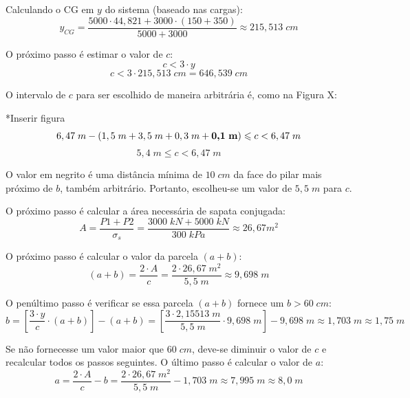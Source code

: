 Calculando o CG em $y$ do sistema (baseado nas cargas):
$$y_{CG}=\frac{5000\cdot44,821+3000\cdot(150+350)}{5000+3000}\approx215,513\;cm$$

O próximo passo é estimar o valor de $c$:
$$c<3\cdot y$$
$$c<3\cdot215,513\;cm=646,539\;cm$$

O intervalo de $c$ para ser escolhido de maneira arbitrária é, como na Figura X:

*Inserir figura
$$6,47\;m-(1,5\;m+3,5\;m+0,3\;m+\textbf{0,1\;m})\leqslant c < 6,47\;m$$
$$5,4\;m\leqslant c<6,47\;m$$

O valor em negrito é uma distância mínima de $10\;cm$ da face do pilar mais próximo de $b$, também arbitrário. Portanto, escolheu-se um valor de $5,5\;m$ para $c$.

O próximo passo é calcular a área necessária de sapata conjugada:
$$A=\frac{P1+P2}{\sigma_s}=\frac{3000\;kN+5000\;kN}{300\;kPa}\approx26,67m^2$$

O próximo passo é calcular o valor da parcela $(a+b)$:
$$(a+b)=\frac{2\cdot A}{c}=\frac{2\cdot26,67\;m^2}{5,5\;m}\approx9,698\;m$$

O penúltimo passo é verificar se essa parcela $(a+b)$ fornece um $b>60\;cm$:
$$b=\left[\frac{3\cdot y}{c}\cdot(a+b)\right]-(a+b)=\left[\frac{3\cdot 2,15513\;m}{5,5\;m}\cdot9,698\;m\right]-9,698\;m\approx1,703\;m\approx1,75\;m$$

Se não fornecesse um valor maior que $60\;cm$, deve-se diminuir o valor de $c$ e recalcular todos os passos seguintes. O último passo é calcular o valor de $a$:
$$a=\frac{2\cdot A}{c}-b=\frac{2\cdot26,67\;m^2}{5,5\;m}-1,703\;m\approx7,995\;m\approx8,0\;m$$